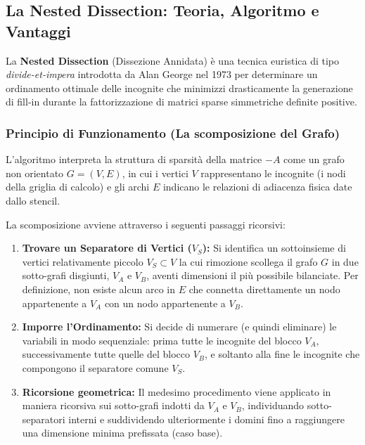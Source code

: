 \documentclass[a4paper,11pt]{article}
\theoremstyle{definition}
\begin{document}
\subsection{La Nested Dissection: Teoria, Algoritmo e Vantaggi}

La \textbf{Nested Dissection} (Dissezione Annidata) è una tecnica euristica di tipo \emph{divide-et-impera} introdotta da Alan George nel 1973 per determinare un ordinamento ottimale delle incognite che minimizzi drasticamente la generazione di fill-in durante la fattorizzazione di matrici sparse simmetriche definite positive.

\subsubsection{Principio di Funzionamento (La scomposizione del Grafo)}

L'algoritmo interpreta la struttura di sparsità della matrice $-A$ come un grafo non orientato $G = (V, E)$, in cui i vertici $V$ rappresentano le incognite (i nodi della griglia di calcolo) e gli archi $E$ indicano le relazioni di adiacenza fisica date dallo stencil.

La scomposizione avviene attraverso i seguenti passaggi ricorsivi:

\begin{enumerate}
  \item \textbf{Trovare un Separatore di Vertici ($V_S$):} Si identifica un sottoinsieme di vertici relativamente piccolo $V_S \subset V$ la cui rimozione scollega il grafo $G$ in due sotto-grafi disgiunti, $V_A$ e $V_B$, aventi dimensioni il più possibile bilanciate. Per definizione, non esiste alcun arco in $E$ che connetta direttamente un nodo appartenente a $V_A$ con un nodo appartenente a $V_B$.
  \item \textbf{Imporre l'Ordinamento:} Si decide di numerare (e quindi eliminare) le variabili in modo sequenziale: prima tutte le incognite del blocco $V_A$, successivamente tutte quelle del blocco $V_B$, e soltanto alla fine le incognite che compongono il separatore comune $V_S$.
  \item \textbf{Ricorsione geometrica:} Il medesimo procedimento viene applicato in maniera ricorsiva sui sotto-grafi indotti da $V_A$ e $V_B$, individuando sotto-separatori interni e suddividendo ulteriormente i domini fino a raggiungere una dimensione minima prefissata (caso base).
\end{enumerate}
\end{document}
